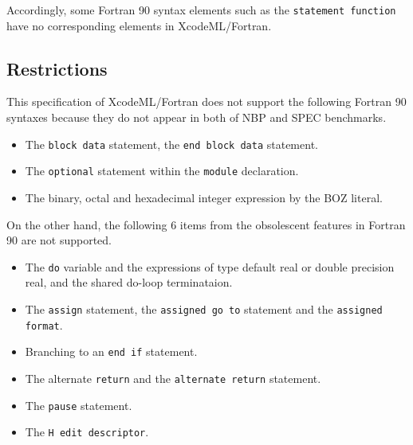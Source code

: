 Accordingly, some Fortran 90 syntax elements such as the {\tt statement function} have no corresponding elements in XcodeML/Fortran.

\subsection{Restrictions}

This specification of XcodeML/Fortran does not support the following Fortran 90 syntaxes because they do not appear in both of NBP and SPEC benchmarks.

\begin{itemize}
\item The {\tt block data} statement, the {\tt end block data} statement.
\item The {\tt optional} statement within the {\tt module} declaration.
\item The binary, octal and hexadecimal integer expression by the BOZ literal.
\end{itemize}

On the other hand, the following 6 items from the obsolescent features in Fortran 90 are not supported.

\begin{itemize}
\item The {\tt do} variable and the expressions of type default real or double precision real, and the shared do-loop terminataion.
\item The {\tt assign} statement, the {\tt assigned go to} statement and the {\tt assigned format}.
\item Branching to an {\tt end if} statement.
\item The alternate {\tt return} and the {\tt alternate return} statement.
\item The {\tt pause} statement.
\item The {\tt H edit descriptor}.
\end{itemize}


